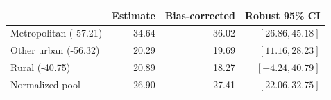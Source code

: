 \begin{center}
\small\renewcommand{\arraystretch}{1.3}
\begin{tabular}{@{}lrrr@{}}\toprule
 & Estimate & Bias-corrected & Robust 95\% CI\\\midrule
Metropolitan (-57.21) & 34.64 & 36.02 & $[26.86, 45.18]$\\
Other urban (-56.32) & 20.29 & 19.69 & $[11.16, 28.23]$\\
Rural (-40.75) & 20.89 & 18.27 & $[-4.24, 40.79]$\\
Normalized pool & 26.90 & 27.41 & $[22.06, 32.75]$\\
\bottomrule\end{tabular}
\end{center}
